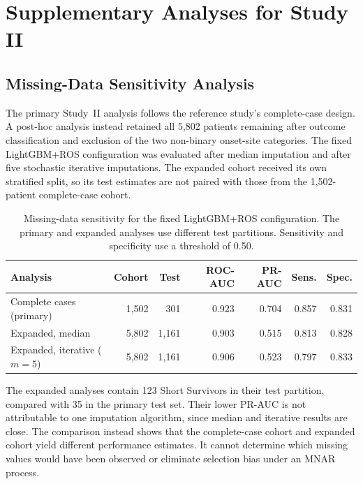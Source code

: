 \chapter{Supplementary Analyses for Study II}
\label{app:study2_supplementary}

\section{Missing-Data Sensitivity Analysis}
\label{app:study2_missing_sensitivity}

The primary Study~II analysis follows the reference study's complete-case design. A post-hoc analysis instead retained all 5,802 patients remaining after outcome classification and exclusion of the two non-binary onset-site categories. The fixed LightGBM+ROS configuration was evaluated after median imputation and after five stochastic iterative imputations. The expanded cohort received its own stratified split, so its test estimates are not paired with those from the 1,502-patient complete-case cohort.

\begin{table}[ht!]
\centering
\caption[Study II missing-data sensitivity]{Missing-data sensitivity for the fixed LightGBM+ROS configuration. The primary and expanded analyses use different test partitions. Sensitivity and specificity use a threshold of 0.50.}
\label{tab:study2_missing_sensitivity}
\small
\begin{tabular}{lrrrrrr}
\toprule
\textbf{Analysis} & \textbf{Cohort} & \textbf{Test} & \textbf{ROC-AUC} & \textbf{PR-AUC} & \textbf{Sens.} & \textbf{Spec.} \\
\midrule
Complete cases (primary) & 1,502 & 301   & 0.923 & 0.704 & 0.857 & 0.831 \\
Expanded, median         & 5,802 & 1,161 & 0.903 & 0.515 & 0.813 & 0.828 \\
Expanded, iterative ($m=5$) & 5,802 & 1,161 & 0.906 & 0.523 & 0.797 & 0.833 \\
\bottomrule
\end{tabular}
\end{table}

The expanded analyses contain 123 Short Survivors in their test partition, compared with 35 in the primary test set. Their lower PR-AUC is not attributable to one imputation algorithm, since median and iterative results are close. The comparison instead shows that the complete-case cohort and expanded cohort yield different performance estimates. It cannot determine which missing values would have been observed or eliminate selection bias under an \gls{MNAR} process.

